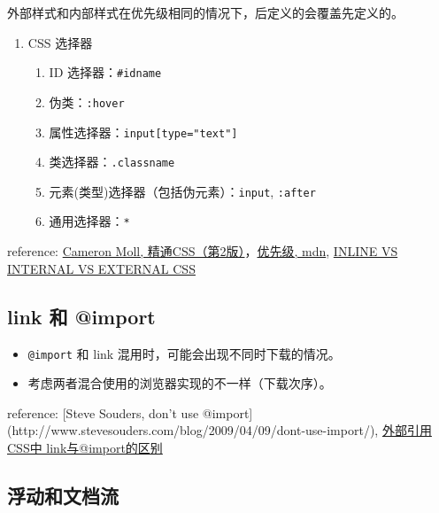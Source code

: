 外部样式和内部样式在优先级相同的情况下，后定义的会覆盖先定义的。

\begin{enumerate}
\def\labelenumi{\arabic{enumi}.}
\setcounter{enumi}{2}
\tightlist
\item
  CSS 选择器

  \begin{enumerate}
  \def\labelenumii{\arabic{enumii}.}
  \tightlist
  \item
    ID 选择器：\lstinline!#idname!
  \item
    伪类：\lstinline!:hover!
  \item
    属性选择器：\lstinline!input[type="text"]!
  \item
    类选择器：\lstinline!.classname!
  \item
    元素(类型)选择器（包括伪元素）：\lstinline!input!,
    \lstinline!:after!
  \item
    通用选择器：\lstinline!*!
  \end{enumerate}
\end{enumerate}

reference: \href{http://book.douban.com/subject/4736167/}{Cameron Moll,
精通CSS（第2版）}，\href{https://developer.mozilla.org/zh-CN/docs/Web/CSS/Specificity}{优先级,
mdn},
\href{https://vineetgupta22.wordpress.com/2011/07/09/inline-vs-internal-vs-external-css/}{INLINE
VS INTERNAL VS EXTERNAL CSS}

\subsection{link 和 @import}\label{link-ux548c-import}

\begin{itemize}
\tightlist
\item
  \lstinline!@import! 和 link 混用时，可能会出现不同时下载的情况。
\item
  考虑两者混合使用的浏览器实现的不一样（下载次序）。
\end{itemize}

reference: {[}Steve Souders, don't use
@import{]}(http://www.stevesouders.com/blog/2009/04/09/dont-use-import/),
\href{http://www.dreamdu.com/blog/2007/05/11/css_link_import/}{外部引用CSS中
link与@import的区别}

\subsection{浮动和文档流}\label{ux6d6eux52a8ux548cux6587ux6863ux6d41}

